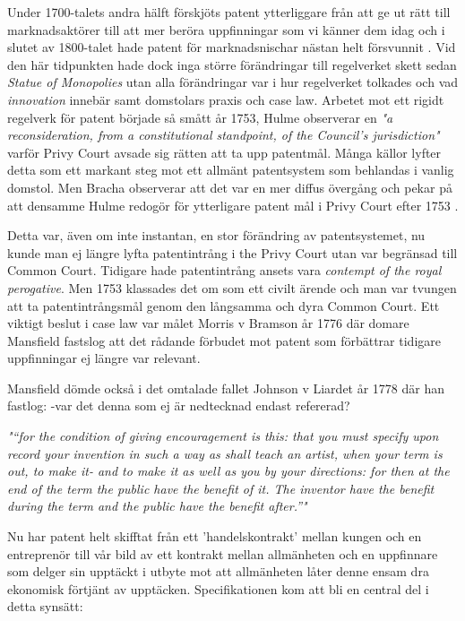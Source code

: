 Under 1700-talets andra hälft förskjöts patent ytterliggare från att ge ut rätt till marknadsaktörer till att mer beröra uppfinningar som vi känner dem idag och i slutet av 1800-talet hade patent för marknadsnischar nästan helt försvunnit \cite{bracha}. 
Vid den här tidpunkten hade dock inga större förändringar till regelverket skett sedan \emph{Statue of Monopolies}
utan alla förändringar var i hur regelverket tolkades och vad \emph{innovation} innebär samt domstolars praxis och case law. Arbetet mot ett rigidt regelverk för patent började så smått år 1753, Hulme \cite{hulme3} observerar en \emph{"a reconsideration, from a constitutional standpoint, of the Council’s jurisdiction"} varför Privy Court avsade sig rätten att ta upp patentmål. Många källor lyfter detta som ett markant steg mot ett allmänt patentsystem som behlandas i vanlig domstol. Men Bracha observerar att det var en mer diffus övergång och pekar på att densamme Hulme redogör för ytterligare patent mål i Privy Court efter 1753 \cite{bracha}.

Detta var, även om inte instantan, en stor förändring av patentsystemet, nu kunde man ej längre lyfta patentintrång i the Privy Court utan var begränsad till Common Court. Tidigare hade patentintrång ansets vara \emph{contempt of the royal perogative}. Men 1753 klassades det om som ett civilt ärende och man var tvungen att ta patentintrångsmål genom den långsamma och dyra Common Court. Ett viktigt beslut i case law var målet Morris v Bramson år 1776 där domare Mansfield fastslog att det rådande förbudet mot patent som förbättrar tidigare uppfinningar ej längre var relevant\cite{bracha}.

Mansfield dömde också i det omtalade fallet Johnson v Liardet år 1778 där han fastlog:
 -var det denna som ej är nedtecknad endast refererad?

\emph{"“for the condition of giving encouragement is this: that 
you must specify upon record your invention in such a 
way as shall teach an artist, when your term is out, to 
make it- and to make it as well as you by your directions: 
for then at the end of the term the public have the benefit 
of it. The inventor have the benefit during the term and 
the public have the benefit after.”"} \cite{hulme1}

Nu har patent helt skifftat från ett 'handelskontrakt' mellan kungen och en entreprenör till vår bild av ett kontrakt mellan allmänheten och en uppfinnare som delger sin upptäckt i utbyte mot att allmänheten låter denne ensam dra ekonomisk förtjänt av upptäcken. Specifikationen kom att bli en central del i detta synsätt: 

